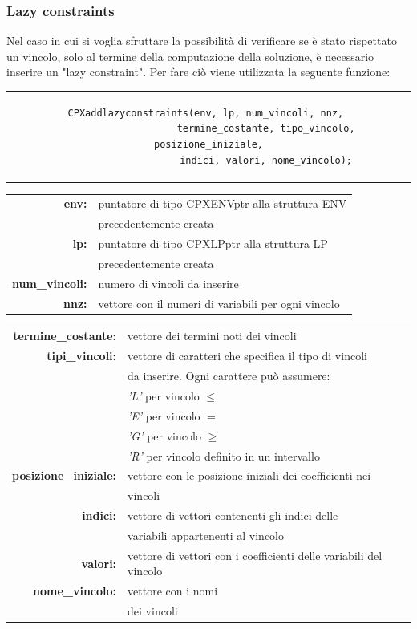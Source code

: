 \subsubsection{Lazy constraints}
Nel caso in cui si voglia sfruttare la possibilità di verificare se è stato rispettato un vincolo, solo al termine della computazione della soluzione, è necessario inserire un "lazy constraint". Per fare ciò viene utilizzata la seguente funzione:
\begin{center}
\begin{tabular}{c}
\begin{lstlisting}[linewidth=380pt, basicstyle=\footnotesize\sffamily,]     
CPXaddlazyconstraints(env, lp, num_vincoli, nnz, 
					termine_costante, tipo_vincolo, posizione_iniziale,
					indici, valori, nome_vincolo);
\end{lstlisting}
\end{tabular}
\end{center}
\begin{table}[h]
\centering
\begin{tabular}{rl}
\textbf{env:} & {puntatore di tipo CPXENVptr alla struttura ENV}\\
& {precedentemente creata}\\
\textbf{lp:} & {puntatore di tipo CPXLPptr alla struttura LP}\\
& {precedentemente creata}\\
\textbf{num\_vincoli:} & {numero di vincoli da inserire}\\
\textbf{nnz:} & {vettore con il numeri di variabili per ogni vincolo}\\ 
\end{tabular}
\end{table}
\begin{table}[h]
\centering
\begin{tabular}{rl}
\textbf{termine\_costante:} & {vettore dei termini noti dei vincoli}\\
\textbf{tipi\_vincoli:} & {vettore di caratteri che specifica il tipo di vincoli}\\
&{da inserire. Ogni carattere può assumere:}\\
&{\textit{'L'} per vincolo $\leq$}\\
&{\textit{'E'} per vincolo $=$}\\
&{\textit{'G'} per vincolo $\geq$}\\
&{\textit{'R'} per vincolo definito in un intervallo}\\
\textbf{posizione\_iniziale:} & {vettore con le posizione iniziali dei coefficienti nei}\\
&{vincoli}\\
\textbf{indici:} & {vettore di vettori contenenti gli indici delle}\\
& {variabili appartenenti al vincolo}\\
\textbf{valori:} & {vettore di vettori con i coefficienti delle variabili del vincolo}\\
\textbf{nome\_vincolo:} & {vettore con i nomi}\\
& {dei vincoli}\\
\end{tabular}
\end{table}
